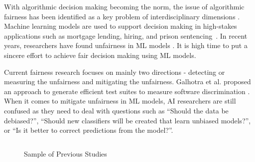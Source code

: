 \documentclass{NSF}
\begin{document}
\begin{nsfdescription}
 
With algorithmic decision making becoming the norm, the issue of algorithmic fairness has been identified as a key problem of interdisciplinary dimensions \cite{IBM} . Machine learning models are used to support decision making in high-stakes applications such as mortgage lending, hiring, and prison sentencing~\cite{ladd1998evidence,burrell2016machine,corbett2018measure,galindo2000credit,yan2013system,chalfin2016productivity,ajit2016prediction,berk2015machine,berk2016forecasting,ozkan2017predicting}. In recent years, researchers have found unfairness in ML models \cite{IBM}. It is high time to put a sincere effort to achieve fair decision making using ML models.

Current fairness research focuses on mainly two directions - detecting or measuring  the unfairness and mitigating the unfairness. Galhotra et al. proposed an approach to generate efficient test suites to measure software discrimination \cite{Galhotra_2017}. When it comes to mitigate unfairness in ML models, AI researchers are still confused as they need to deal with questions such as ``Should the data be debiased?'', ``Should new classifiers will be created that learn unbiased models?'', or ``Is it better to correct predictions from the model?''. 

 \begin{figure} 
\caption{Sample of Previous Studies}
\small
 \begin{center}
\begin{tabular}{p{0.6in}|p{3.9in}}
    

\end{tabular}
\end{center}
\end{figure}
\end{nsfdescription}
\end{document}
